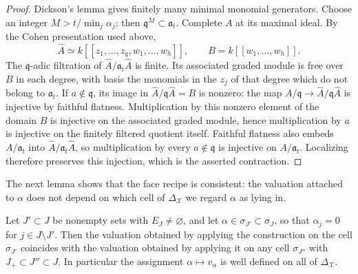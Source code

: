 \begin{proof}
Dickson's lemma gives finitely many minimal monomial generators. Choose
an integer $M>t/\min_j\alpha_j$; then $\mathfrak q^M\subset\mathfrak a_t$.
Complete $A$ at its maximal ideal. By the Cohen presentation used above,
\[
 \widehat A\simeq k[[z_1,\ldots,z_q,w_1,\ldots,w_h]],
 \qquad B=k[[w_1,\ldots,w_h]].
\]
The $\mathfrak q$-adic filtration of
$\widehat A/\mathfrak a_t\widehat A$ is finite. Its associated graded
module is free over $B$ in each degree, with basis the monomials in the
$z_j$ of that degree which do not belong to $\mathfrak a_t$. If
$a\notin\mathfrak q$, its image in
$\widehat A/\mathfrak q\widehat A=B$ is nonzero: the map
$A/\mathfrak q\to\widehat A/\mathfrak q\widehat A$ is injective by
faithful flatness. Multiplication by this nonzero element of the domain
$B$ is injective on the associated graded module, hence multiplication by
$a$ is injective on the finitely filtered quotient itself. Faithful
flatness also embeds $A/\mathfrak a_t$ into
$\widehat A/\mathfrak a_t\widehat A$, so multiplication by every
$a\notin\mathfrak q$ is injective on $A/\mathfrak a_t$. Localizing
therefore preserves this injection, which is the asserted contraction.
\end{proof}

The next lemma shows that the face recipe is consistent: the
valuation attached to $\alpha$ does not depend on which cell of
$\Delta_{\mathcal X}$ we regard $\alpha$ as lying in.

\begin{lemma}
\label{lem:monomial-face-compatibility}
Let $J'\subset J$ be nonempty sets with $E_J\neq\varnothing$, and let
$\alpha\in\sigma_{J'}\subset\sigma_J$, so that $\alpha_j=0$ for
$j\in J\setminus J'$. Then the valuation obtained by applying the
construction on the cell $\sigma_{J'}$ coincides with the valuation
obtained by applying it on any cell $\sigma_{J''}$ with
$J_+\subset J''\subset J$. In particular the assignment
$\alpha\mapsto v_\alpha$ is well defined on all of
$\Delta_{\mathcal X}$.
\end{lemma}

